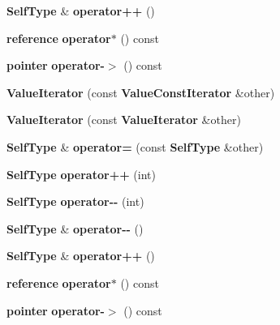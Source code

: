 \begin{DoxyCompactItemize}
\item 
{\bf Self\+Type} \& {\bfseries operator++} ()\label{class_json_1_1_value_iterator_a92146c46f8249e2b2d12869e70cd4cee}

\item 
{\bf reference} {\bfseries operator$\ast$} () const \label{class_json_1_1_value_iterator_aaa5be3457eedf0526a03b8a3b4c7c0a0}

\item 
{\bf pointer} {\bfseries operator-\/$>$} () const \label{class_json_1_1_value_iterator_ad9882e4ce815cef6a504afa113544bfb}

\item 
{\bfseries Value\+Iterator} (const {\bf Value\+Const\+Iterator} \&other)\label{class_json_1_1_value_iterator_aa85aa208670891670392259efa0143bb}

\item 
{\bfseries Value\+Iterator} (const {\bf Value\+Iterator} \&other)\label{class_json_1_1_value_iterator_a7d5e58a9a4a553968acdf3064b39d21c}

\item 
{\bf Self\+Type} \& {\bfseries operator=} (const {\bf Self\+Type} \&other)\label{class_json_1_1_value_iterator_a263912ab48a278202312cfddf636bc71}

\item 
{\bf Self\+Type} {\bfseries operator++} (int)\label{class_json_1_1_value_iterator_abcf4ddd994a010742cd4a436d65acd08}

\item 
{\bf Self\+Type} {\bfseries operator-\/-\/} (int)\label{class_json_1_1_value_iterator_a06d6a29d96caf6af324a53973159e12b}

\item 
{\bf Self\+Type} \& {\bfseries operator-\/-\/} ()\label{class_json_1_1_value_iterator_a811302a868518a0995a9def955df5720}

\item 
{\bf Self\+Type} \& {\bfseries operator++} ()\label{class_json_1_1_value_iterator_a92146c46f8249e2b2d12869e70cd4cee}

\item 
{\bf reference} {\bfseries operator$\ast$} () const \label{class_json_1_1_value_iterator_aaa5be3457eedf0526a03b8a3b4c7c0a0}

\item 
{\bf pointer} {\bfseries operator-\/$>$} () const \label{class_json_1_1_value_iterator_ad9882e4ce815cef6a504afa113544bfb}

\end{DoxyCompactItemize}
